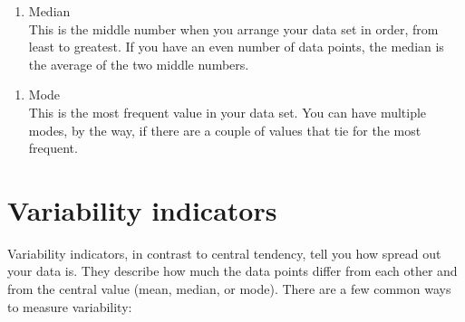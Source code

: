 \documentclass[
]{book}
\newenvironment{Shaded}{\begin{snugshade}}{\end{snugshade}}
\newcommand{\AttributeTok}[1]{\textcolor[rgb]{0.13,0.29,0.53}{#1}}
\newcommand{\CommentTok}[1]{\textcolor[rgb]{0.56,0.35,0.01}{\textit{#1}}}
\newcommand{\FunctionTok}[1]{\textcolor[rgb]{0.13,0.29,0.53}{\textbf{#1}}}
\newcommand{\NormalTok}[1]{#1}
\newcommand{\SpecialCharTok}[1]{\textcolor[rgb]{0.81,0.36,0.00}{\textbf{#1}}}
\newcommand{\StringTok}[1]{\textcolor[rgb]{0.31,0.60,0.02}{#1}}
\providecommand{\tightlist}{%
  \setlength{\itemsep}{0pt}\setlength{\parskip}{0pt}}
\begin{document}
\begin{enumerate}
\def\labelenumi{\arabic{enumi}.}
\setcounter{enumi}{1}
\tightlist
\item
  Median\\
  This is the middle number when you arrange your data set in order, from least to greatest. If you have an even number of data points, the median is the average of the two middle numbers.\\
\end{enumerate}

\begin{Shaded}
\end{Shaded}

\begin{enumerate}
\def\labelenumi{\arabic{enumi}.}
\setcounter{enumi}{2}
\tightlist
\item
  Mode\\
  This is the most frequent value in your data set. You can have multiple modes, by the way, if there are a couple of values that tie for the most frequent.
\end{enumerate}

\begin{Shaded}
\end{Shaded}

\hypertarget{variability-indicators}{%
\section{Variability indicators}\label{variability-indicators}}

Variability indicators, in contrast to central tendency, tell you how spread out your data is. They describe how much the data points differ from each other and from the central value (mean, median, or mode). There are a few common ways to measure variability:
\end{document}
